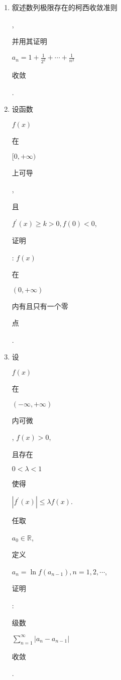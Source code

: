 \documentclass[10pt]{article}
\begin{document}
\begin{enumerate}
  \item \begin{CJK}{UTF8}{mj}叙述数列极限存在的柯西收敛准则\end{CJK}, \begin{CJK}{UTF8}{mj}并用其证明\end{CJK} $a_{n}=1+\frac{1}{2^{2}}+\cdots+\frac{1}{n^{2}}$ \begin{CJK}{UTF8}{mj}收敛\end{CJK}.

  \item \begin{CJK}{UTF8}{mj}设函数\end{CJK} $f(x)$ \begin{CJK}{UTF8}{mj}在\end{CJK} $[0,+\infty)$ \begin{CJK}{UTF8}{mj}上可导\end{CJK}, \begin{CJK}{UTF8}{mj}且\end{CJK} $f^{\prime}(x) \geqslant k>0, f(0)<0$, \begin{CJK}{UTF8}{mj}证明\end{CJK}: $f(x)$ \begin{CJK}{UTF8}{mj}在\end{CJK} $(0,+\infty)$ \begin{CJK}{UTF8}{mj}内有且只有一个零\end{CJK} \begin{CJK}{UTF8}{mj}点\end{CJK}.

  \item \begin{CJK}{UTF8}{mj}设\end{CJK} $f(x)$ \begin{CJK}{UTF8}{mj}在\end{CJK} $(-\infty,+\infty)$ \begin{CJK}{UTF8}{mj}内可微\end{CJK}, $f(x)>0$, \begin{CJK}{UTF8}{mj}且存在\end{CJK} $0<\lambda<1$ \begin{CJK}{UTF8}{mj}使得\end{CJK} $\left|f^{\prime}(x)\right| \leqslant \lambda f(x)$. \begin{CJK}{UTF8}{mj}任取\end{CJK} $a_{0} \in \mathbb{R}$, \begin{CJK}{UTF8}{mj}定义\end{CJK} $a_{n}=\ln f\left(a_{n-1}\right), n=1,2, \cdots$, \begin{CJK}{UTF8}{mj}证明\end{CJK}: \begin{CJK}{UTF8}{mj}级数\end{CJK} $\sum_{n=1}^{\infty}\left|a_{n}-a_{n-1}\right|$ \begin{CJK}{UTF8}{mj}收敛\end{CJK}.


\end{enumerate}
\end{document}
